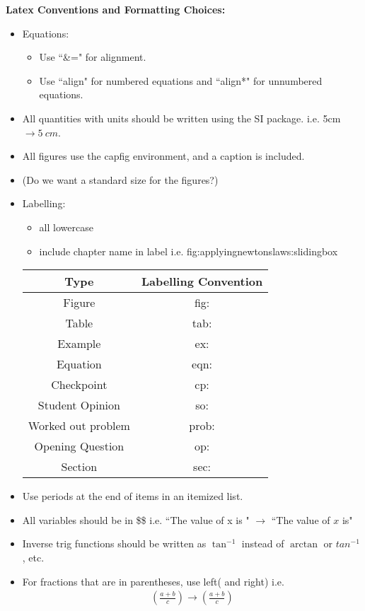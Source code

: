 \documentclass[11pt]{article}
\begin{document}
\textbf{Latex Conventions and Formatting Choices:}\\
\begin{itemize}
\item Equations:
\begin{itemize}
\item Use ``\&=" for alignment.
\item Use ``align" for numbered equations and ``align*" for unnumbered equations.
\end{itemize}
\item All quantities with units should be written using the SI package. i.e. 5cm $\rightarrow \SI{5}{cm}$.
\item All figures use the capfig environment, and a caption is included.

\item (Do we want a standard size for the figures?)
\item Labelling:
\begin{itemize}
\item all lowercase 
\item include chapter name in label i.e. fig:applyingnewtonslaws:slidingbox
\end{itemize}
\begin{table}[h!]
\centering
\begin{tabular}{|c|c|}
\hline
\textbf{Type}      & \textbf{Labelling Convention} \\ \hline
Figure             & fig:                          \\ \hline
Table              & tab:                          \\ \hline
Example            & ex:                           \\ \hline
Equation           & eqn:                          \\ \hline
Checkpoint         & cp:                           \\ \hline
Student Opinion    & so:                           \\ \hline
Worked out problem & prob:                         \\ \hline
Opening Question   & op:                           \\ \hline
Section            & sec:                           \\ \hline
\end{tabular}
\end{table}
\item Use periods at the end of items in an itemized list.
\item All variables should be in \$\$ i.e. ``The value of  x is " $\rightarrow$ ``The value of $x$ is"
\item Inverse trig functions should be written as $\tan^{-1}$ instead of $\arctan$ or $tan^{-1}$, etc.
\item For fractions that are in parentheses, use left( and right) i.e.
\begin{align*}
(\frac{a+b}{c}) \rightarrow \left(\frac{a+b}{c}\right) 
\end{align*}


\end{itemize}
\end{document}
